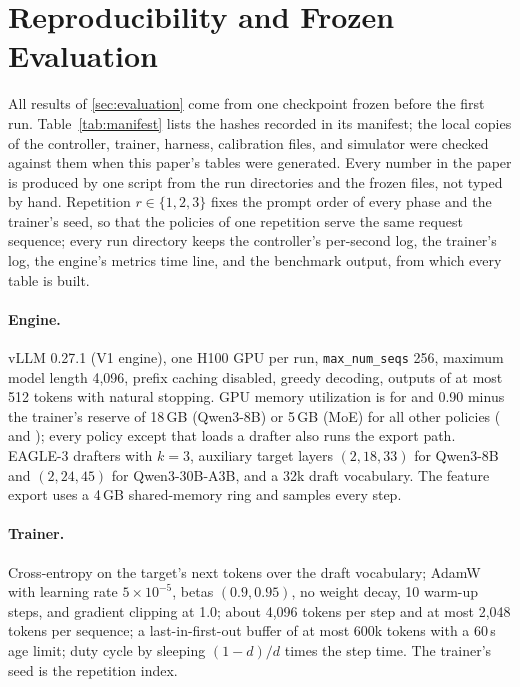 \FloatBarrier
\section{Reproducibility and Frozen Evaluation}\label{app:manifest}

All results of \cref{sec:evaluation} come from one checkpoint frozen before the first run. Table~\ref{tab:manifest} lists the hashes recorded in its manifest; the local copies of the controller, trainer, harness, calibration files, and simulator were checked against them when this paper's tables were generated. Every number in the paper is produced by one script from the run directories and the frozen files, not typed by hand. Repetition $r\in\{1,2,3\}$ fixes the prompt order of every phase and the trainer's seed, so that the policies of one repetition serve the same request sequence; every run directory keeps the controller's per-second log, the trainer's log, the engine's metrics time line, and the benchmark output, from which every table is built.

\begin{table}[!htbp]
\caption{Hashes of the frozen checkpoint and of the files added later for  and its sensitivity check (first 16 hexadecimal digits of SHA-256).}
\label{tab:manifest}
\centering\small

\end{table}

\paragraph{Engine.} vLLM 0.27.1 (V1 engine), one H100 GPU per run, \texttt{max\_num\_seqs} 256, maximum model length 4{,}096, prefix caching disabled, greedy decoding, outputs of at most 512 tokens with natural stopping. GPU memory utilization is  for  and 0.90 minus the trainer's reserve of 18\,GB (Qwen3-8B) or 5\,GB (MoE) for all other policies ( and ); every policy except  that loads a drafter also runs the export path. EAGLE-3 drafters with $k{=}3$, auxiliary target layers $(2,18,33)$ for Qwen3-8B and $(2,24,45)$ for Qwen3-30B-A3B, and a 32k draft vocabulary. The feature export uses a 4\,GB shared-memory ring and samples every step.

\paragraph{Trainer.} Cross-entropy on the target's next tokens over the draft vocabulary; AdamW with learning rate $5\times10^{-5}$, betas $(0.9,0.95)$, no weight decay, 10 warm-up steps, and gradient clipping at 1.0; about 4{,}096 tokens per step and at most 2{,}048 tokens per sequence; a last-in-first-out buffer of at most 600k tokens with a 60\,s age limit; duty cycle by sleeping $(1-d)/d$ times the step time. The trainer's seed is the repetition index.

